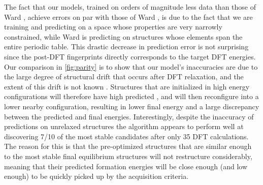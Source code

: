 The fact that our models,
trained on orders of magnitude less data than those of Ward ,
achieve errors on par with those of Ward ,
is due to the fact that we are training and predicting on a space whose properties are very narrowly constrained, while Ward  is predicting on structures whose elements span the entire periodic table.
%
This drastic decrease in prediction error is not surprising since the post-DFT fingerprints directly corresponds to the target DFT energies.
%
Our comparison in \ref{fig:parity} is to show that our model's inaccuracies are due to the large degree of structural drift that occurs after DFT relaxation, and the extent of this drift is not known .
%
Structures that are initialized in high energy configurations will therefore have high predicted \DHf,
and will then reconfigure into a lower nearby configuration, resulting in lower final energy and a large discrepancy between the predicted and final energies.
%
Interestingly, despite the inaccuracy of predictions on unrelaxed structures the algorithm appears to perform well at discovering \num{7/10} of the most stable candidates after only \num{35} DFT calculations.
%
The reason for this is that the pre-optimized structures that are similar enough to the most stable final equilibrium structures will not restructure considerably, meaning that their predicted formation energies will be close enough (and low enough) to be quickly picked up by the acquisition criteria.


